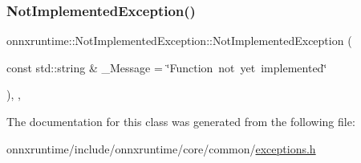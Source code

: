 \mbox{\label{classonnxruntime_1_1NotImplementedException_a4d992d62f2fe206f66728de44b6c18cc}} 
\subsubsection{\texorpdfstring{Not\+Implemented\+Exception()}{NotImplementedException()}\hspace{0.1cm}{\footnotesize\ttfamily [2/2]}}
{\footnotesize\ttfamily onnxruntime\+::\+Not\+Implemented\+Exception\+::\+Not\+Implemented\+Exception (\begin{DoxyParamCaption}\item[{const std\+::string \&}]{\+\_\+\+Message = {\ttfamily \char`\"{}Function~not~yet~implemented\char`\"{}} }\end{DoxyParamCaption})\hspace{0.3cm}{\ttfamily [inline]}, {\ttfamily [explicit]}, {\ttfamily [noexcept]}}



The documentation for this class was generated from the following file\+:\begin{DoxyCompactItemize}
\item 
onnxruntime/include/onnxruntime/core/common/\mbox{\hyperlink{exceptions_8h}{exceptions.\+h}}\end{DoxyCompactItemize}
